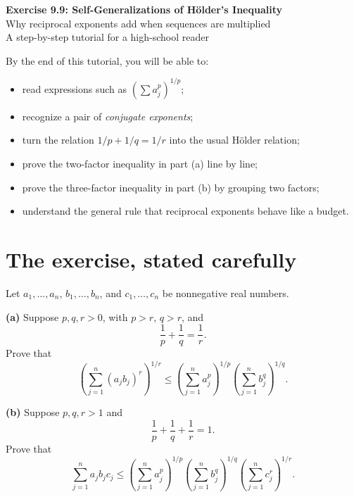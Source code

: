 \documentclass[11pt]{article}
\begin{document}
\begin{center}
  {\LARGE\bfseries Exercise 9.9: Self-Generalizations of H\"older's Inequality}\\[0.35em]
  {\Large Why reciprocal exponents add when sequences are multiplied}\\[0.7em]
  {\large A step-by-step tutorial for a high-school reader}
\end{center}

\vspace{0.4em}

\begin{ideaBox}
By the end of this tutorial, you will be able to:
\begin{itemize}
  \item read expressions such as \(\left(\sum a_j^p\right)^{1/p}\);
  \item recognize a pair of \emph{conjugate exponents};
  \item turn the relation \(1/p+1/q=1/r\) into the usual H\"older relation;
  \item prove the two-factor inequality in part (a) line by line;
  \item prove the three-factor inequality in part (b) by grouping two factors;
  \item understand the general rule that reciprocal exponents behave like a budget.
\end{itemize}
\end{ideaBox}

\tableofcontents
\newpage

\section{The exercise, stated carefully}

\begin{problemBox}
Let \(a_1,\ldots,a_n\), \(b_1,\ldots,b_n\), and \(c_1,\ldots,c_n\) be nonnegative real numbers.

\textbf{(a)} Suppose \(p,q,r>0\), with \(p>r\), \(q>r\), and
\[
  \frac1p+\frac1q=\frac1r.
\]
Prove that
\[
 \boxed{\displaystyle
 \left(\sum_{j=1}^{n}(a_jb_j)^r\right)^{1/r}
 \leq
 \left(\sum_{j=1}^{n}a_j^p\right)^{1/p}
 \left(\sum_{j=1}^{n}b_j^q\right)^{1/q}.}
 \tag{A}
\]

\textbf{(b)} Suppose \(p,q,r>1\) and
\[
  \frac1p+\frac1q+\frac1r=1.
\]
Prove that
\[
 \boxed{\displaystyle
 \sum_{j=1}^{n}a_jb_jc_j
 \leq
 \left(\sum_{j=1}^{n}a_j^p\right)^{1/p}
 \left(\sum_{j=1}^{n}b_j^q\right)^{1/q}
 \left(\sum_{j=1}^{n}c_j^r\right)^{1/r}.}
 \tag{B}
\]
\end{problemBox}
\end{document}
